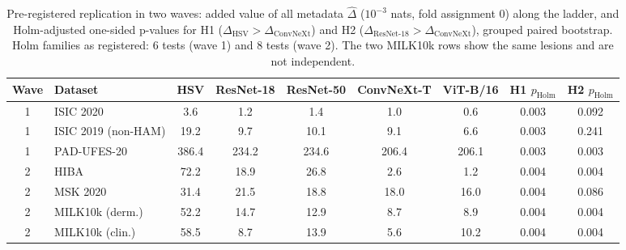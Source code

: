 \begin{table}[tp]\centering\footnotesize
\caption{Pre-registered replication in two waves: added value of all metadata $\hat\Delta$ ($10^{-3}$ nats, fold assignment 0) along the ladder, and Holm-adjusted one-sided p-values for H1 ($\Delta_{\mathrm{HSV}}>\Delta_{\mathrm{ConvNeXt}}$) and H2 ($\Delta_{\mathrm{ResNet\text{-}18}}>\Delta_{\mathrm{ConvNeXt}}$), grouped paired bootstrap. Holm families as registered: 6 tests (wave 1) and 8 tests (wave 2). The two MILK10k rows show the same lesions and are not independent.}\label{tab:rep}
\begin{tabular}{clccccccc}\toprule
Wave & Dataset & HSV & ResNet-18 & ResNet-50 & ConvNeXt-T & ViT-B/16 & H1 $p_{\mathrm{Holm}}$ & H2 $p_{\mathrm{Holm}}$\\\midrule
1 & ISIC 2020 & 3.6 & 1.2 & 1.4 & 1.0 & 0.6 & 0.003 & 0.092\\
1 & ISIC 2019 (non-HAM) & 19.2 & 9.7 & 10.1 & 9.1 & 6.6 & 0.003 & 0.241\\
1 & PAD-UFES-20 & 386.4 & 234.2 & 234.6 & 206.4 & 206.1 & 0.003 & 0.003\\
\midrule
2 & HIBA & 72.2 & 18.9 & 26.8 & 2.6 & 1.2 & 0.004 & 0.004\\
2 & MSK 2020 & 31.4 & 21.5 & 18.8 & 18.0 & 16.0 & 0.004 & 0.086\\
2 & MILK10k (derm.) & 52.2 & 14.7 & 12.9 & 8.7 & 8.9 & 0.004 & 0.004\\
2 & MILK10k (clin.) & 58.5 & 8.7 & 13.9 & 5.6 & 10.2 & 0.004 & 0.004\\
\bottomrule\end{tabular}\end{table}
